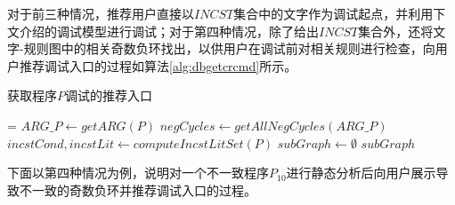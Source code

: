 对于前三种情况，推荐用户直接以$INCST$集合中的文字作为调试起点，并利用下文介绍的调试模型进行调试；对于第四种情况，除了给出$INCST$集合外，还将文字-规则图中的相关奇数负环找出，以供用户在调试前对相关规则进行检查，向用户推荐调试入口的过程如算法\ref{alg:dbgetcrcmd}所示。

\begin{algorithm2e}[H]
    \DontPrintSemicolon
    \SetNoFillComment
    \caption{获取程序$P$调试的推荐入口}
    \label{alg:dbgetcrcmd}
    \setcounter{AlgoLine}{0}
    \everypar={\nl}
    $ARG\_P \gets getARG(P)$ 
    $negCycles \gets getAllNegCycles(ARG\_P)$ 
    $incstCond, incstLit \gets computeIncstLitSet(P)$\;
    {
        $subGraph \gets \emptyset$\;
        \Return $subGraph$
    }
\end{algorithm2e}

下面以第四种情况为例，说明对一个不一致程序$P_{10}$进行静态分析后向用户展示导致不一致的奇数负环并推荐调试入口的过程。

